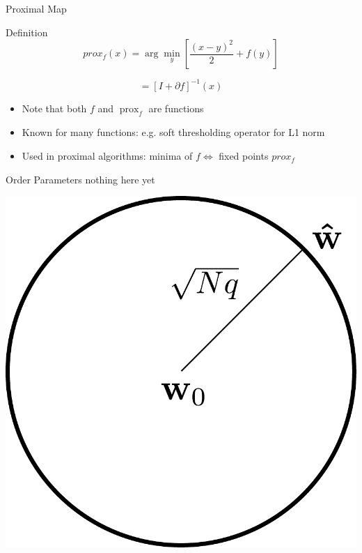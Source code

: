 \documentclass[pdf]{beamer}
\DeclareMathOperator{\prox}{prox}
\begin{document}
\begin{frame}{Proximal Map}


\begin{block}{Definition}
\begin{equation*}
prox_f(x) = \arg\min_y \left[\frac{(x-y)^2}{2} + f(y)\right]
\end{equation*}

\begin{equation*}
= \left[I + \partial f\right]^{-1} (x)
\end{equation*}


\end{block}
\vspace{.2 in}

\begin{itemize}
\item{Note that both $f$ and $\prox_f$ are functions}
\vspace{.2 in}

\item{Known for many functions: e.g. soft thresholding operator for L1 norm}

\vspace{.2 in}

\item{Used in proximal algorithms: minima of $f  \Leftrightarrow$ fixed points $ prox_f$}

\end{itemize}

\end{frame}

\begin{frame}{}
\begin{minipage}{.45\textwidth}

    \begin{block}{Order Parameters}
        nothing here yet
    \end{block}

\end{minipage}
\begin{minipage}{.45\textwidth}

    \begin{center}
        \includegraphics[width =.9in]{errorCircle.pdf}
    \end{center}

\end{minipage}




\end{frame}
\end{document}
